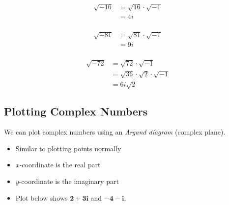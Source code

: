 \documentclass{article}
\begin{document}
\begin{minipage}{0.3\textwidth}
\begin{align*}
    \sqrt{-16} &= \sqrt{16} \cdot \sqrt{-1} \\
    &= 4i \\
\end{align*}
\end{minipage}
\begin{minipage}{0.4\textwidth}
\begin{align*}
    \sqrt{-81} &= \sqrt{81} \cdot \sqrt{-1} \\
    &= 9i \\
\end{align*}
\end{minipage}
\begin{minipage}{0.25\textwidth}
\begin{align*}
    \sqrt{-72} &= \sqrt{72} \cdot \sqrt{-1} \\
    &= \sqrt{36} \cdot \sqrt{2} \cdot \sqrt{-1} \\
    &= 6i \sqrt{2}
\end{align*}
\end{minipage}
\bigskip 

\subsection*{Plotting Complex Numbers}

We can plot complex numbers using an \textit{Argand diagram} (complex plane).

\begin{itemize}
    \item Similar to plotting points normally
    \item $x$-coordinate is the real part
    \item $y$-coordinate is the imaginary part
    \item Plot below shows {\color{red}$\pmb{2 + 3i}$} and {\color{blue}$\pmb{-4-i}$}.
\end{itemize}

\begin{center}
\end{center}
\end{document}
